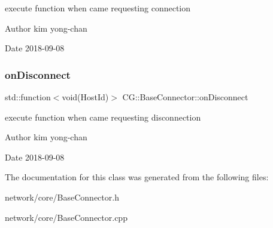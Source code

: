 execute function when came requesting connection 

\begin{DoxyAuthor}{Author}
kim yong-\/chan 
\end{DoxyAuthor}
\begin{DoxyDate}{Date}
2018-\/09-\/08 
\end{DoxyDate}
\mbox{\label{class_c_g_1_1_base_connector_ac33259324e8654e0e89762a723fddbb0}} 
\subsubsection{\texorpdfstring{on\+Disconnect}{onDisconnect}}
{\footnotesize\ttfamily std\+::function$<$void(Host\+Id)$>$ C\+G\+::\+Base\+Connector\+::on\+Disconnect}



execute function when came requesting disconnection 

\begin{DoxyAuthor}{Author}
kim yong-\/chan 
\end{DoxyAuthor}
\begin{DoxyDate}{Date}
2018-\/09-\/08 
\end{DoxyDate}


The documentation for this class was generated from the following files\+:\begin{DoxyCompactItemize}
\item 
network/core/Base\+Connector.\+h\item 
network/core/Base\+Connector.\+cpp\end{DoxyCompactItemize}
